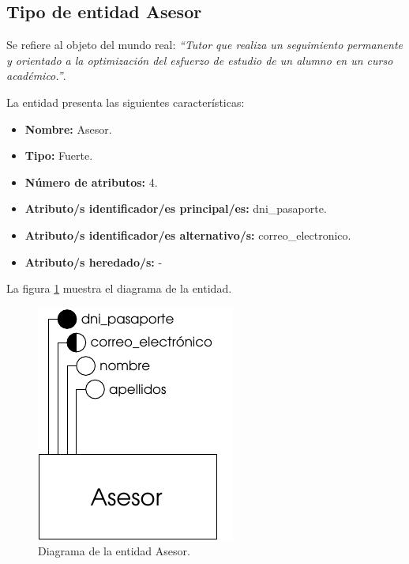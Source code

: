 \subsection{Tipo de entidad Asesor}

   \begin{description}

   \item[Definición] Se refiere al objeto del mundo real: \emph{``Tutor que
        realiza un seguimiento permanente y orientado a la optimización del
        esfuerzo de estudio de un alumno en un curso académico.''}.

   \item[Características] La entidad presenta las siguientes características:
      \begin{itemize}
         \item \textbf{Nombre:} Asesor.
         \item \textbf{Tipo:} Fuerte.
         \item \textbf{Número de atributos:} 4.
         \item \textbf{Atributo/s identificador/es principal/es:} dni\_pasaporte.
         \item \textbf{Atributo/s identificador/es alternativo/s:} correo\_electronico.
         \item \textbf{Atributo/s heredado/s:} -
      \end{itemize}

   \item[Diagrama] La figura \ref{diagramaAsesor} muestra el diagrama de la entidad.
   \item \begin{figure}[!ht]
            \begin{center}
            \includegraphics[]{07.Modelo_Entidad-Interrelacion/7.2.Analisis_Entidades/diagramas/asesor.pdf}
            \caption{Diagrama de la entidad Asesor.}
            \label{diagramaAsesor}
            \end{center}
         \end{figure}


\end{description}
